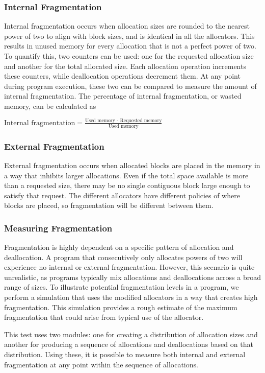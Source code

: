 \subsubsection{Internal Fragmentation}
Internal fragmentation occurs when allocation sizes are rounded to the nearest power of two to align with block sizes, and is identical in all the allocators. This results in unused memory for every allocation that is not a perfect power of two. To quantify this, two counters can be used: one for the requested allocation size and another for the total allocated size. Each allocation operation increments these counters, while deallocation operations decrement them. At any point during program execution, these two can be compared to measure the amount of internal fragmentation. The percentage of internal fragmentation, or wasted memory, can be calculated as

$
    \text{Internal fragmentation} = \frac{\text{Used memory - Requested memory}}{\text{Used memory}}
$

\subsubsection{External Fragmentation}
External fragmentation occurs when allocated blocks are placed in the memory in a way that inhibits larger allocations. Even if the total space available is more than a requested size, there may be no single contiguous block large enough to satisfy that request. The different allocators have different policies of where blocks are placed, so fragmentation will be different between them.


\subsubsection{Measuring Fragmentation}
Fragmentation is highly dependent on a specific pattern of allocation and deallocation. A program that consecutively only allocates powers of two will experience no internal or external fragmentation. However, this scenario is quite unrealistic, as programs typically mix allocations and deallocations across a broad range of sizes. To illustrate potential fragmentation levels in a program, we perform a simulation that uses the modified allocators in a way that creates high fragmentation. This simulation provides a rough estimate of the maximum fragmentation that could arise from typical use of the allocator.

This test uses two modules: one for creating a distribution of allocation sizes and another for producing a sequence of allocations and deallocations based on that distribution. Using these, it is possible to measure both internal and external fragmentation at any point within the sequence of allocations.

